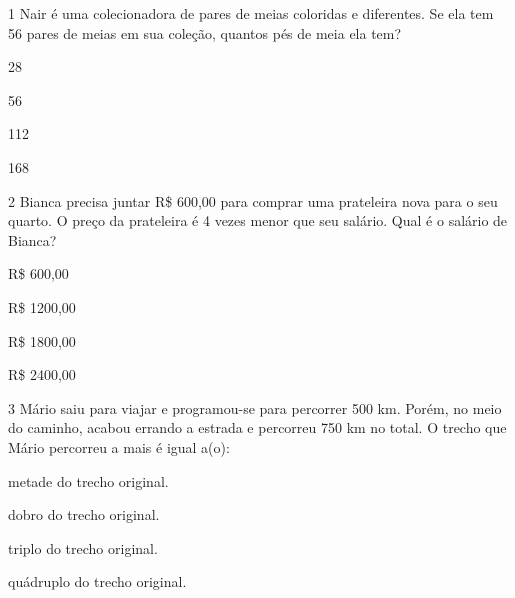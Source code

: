 
\pagebreak
{}

\num{1} Nair é uma colecionadora de pares de meias coloridas e diferentes. Se
ela tem 56 pares de meias em sua coleção, quantos pés de meia ela tem?

\begin{escolha}
\item 28

\item 56

\item 112

\item 168
\end{escolha}

\num{2} Bianca precisa juntar R\$ 600,00 para comprar uma prateleira nova para o
seu quarto. O preço da prateleira é 4 vezes menor que seu salário. Qual
é o salário de Bianca?

\begin{escolha}
\item R\$ 600,00

\item R\$ 1200,00

\item R\$ 1800,00

\item R\$ 2400,00
\end{escolha}

\num{3} Mário saiu para viajar e programou-se para percorrer 500 km. Porém, no
meio do caminho, acabou errando a estrada e percorreu 750 km no total. O
trecho que Mário percorreu a mais é igual a(o):

\begin{escolha}
\item metade do trecho original.

\item dobro do trecho original.

\item triplo do trecho original.

\item quádruplo do trecho original.
\end{escolha}


